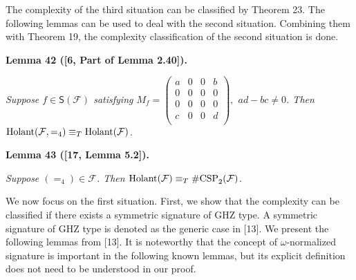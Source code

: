 \documentclass[10pt,a4paper]{article}
\begin{document}



The complexity of the third situation can be classified by Theorem 23. The following lemmas can be used to deal with the second situation. Combining them with Theorem 19, the complexity classification of the second situation is done.\par





\par\medskip\noindent\textbf{
\textbf{Lemma 42}\textbf{ }([6, Part of Lemma 2.40])\textbf{.}
}\par



\emph{Suppose $f\in\textsf{S}(\mathcal{F})$ satisfying $M_{f}=\begin{pmatrix}a&0&0&b\\
0&0&0&0\\
0&0&0&0\\
c&0&0&d\\
\end{pmatrix},$ $ad-bc\neq 0$. Then $\textup{{Holant}}(\mathcal{F},=_{4})\equiv_{T}\textup{{Holant}}(\mathcal{F})$.}\par







\par\medskip\noindent\textbf{
\textbf{Lemma 43}\textbf{ }([17, Lemma 5.2])\textbf{.}
}\par



\emph{Suppose $(=_{4})\in\mathcal{F}$. Then $\textup{{Holant}}(\mathcal{F})\equiv_{T}\textup{{\#CSP}}_{2}(\mathcal{F})$.}\par






We now focus on the first situation. First, we show that the complexity can be classified if there exists a symmetric signature of GHZ type.
A symmetric signature of GHZ type is denoted as the generic case in [13]. We present the following lemmas from [13]. It is noteworthy that the concept of $\omega$-normalized signature is important in the following known lemmas, but its explicit definition does not need to be understood in our proof.\par
\end{document}
